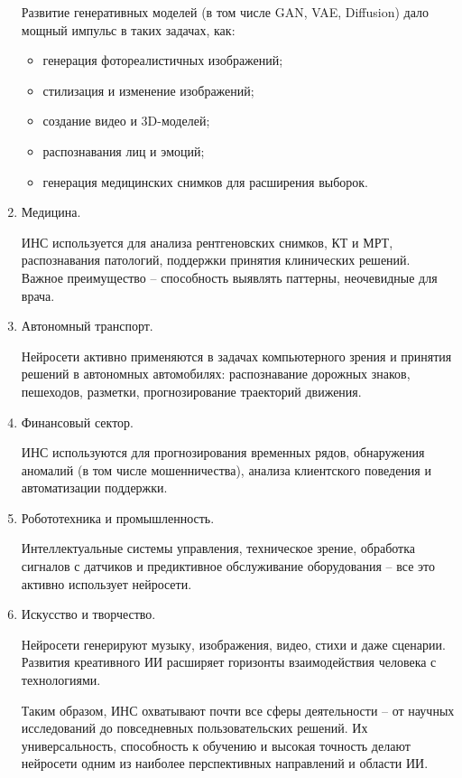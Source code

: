 \begin{enumerate}
	Развитие генеративных моделей (в том числе GAN, VAE, Diffusion) дало мощный импульс в таких задачах, как:
	
	\begin{itemize}
		\item генерация фотореалистичных изображений;
		\item стилизация и изменение изображений;
		\item создание видео и 3D-моделей;
		\item распознавания лиц и эмоций;
		\item генерация медицинских снимков для расширения выборок.
	\end{itemize}
	
	\item Медицина.

ИНС используется для анализа рентгеновских снимков, КТ и МРТ, распознавания патологий, поддержки принятия клинических решений. Важное преимущество – способность выявлять паттерны, неочевидные для врача.

	\item Автономный транспорт.
	
Нейросети активно применяются в задачах компьютерного зрения и принятия решений в автономных автомобилях: распознавание дорожных знаков, пешеходов, разметки, прогнозирование траекторий движения.

	\item Финансовый сектор.
	
ИНС используются для прогнозирования временных рядов, обнаружения аномалий (в том числе мошенничества), анализа клиентского поведения и автоматизации поддержки.

	\item Робототехника и промышленность.

Интеллектуальные системы управления, техническое зрение, обработка сигналов с датчиков и предиктивное обслуживание оборудования – все это активно использует нейросети.

	\item Искусство и творчество.

Нейросети генерируют музыку, изображения, видео, стихи и даже сценарии. Развития креативного ИИ расширяет горизонты взаимодействия человека с технологиями.

Таким образом, ИНС охватывают почти все сферы деятельности – от научных исследований до повседневных пользовательских решений. Их универсальность, способность к обучению и высокая точность делают нейросети одним из наиболее перспективных направлений и области ИИ.
	
\end{enumerate}

